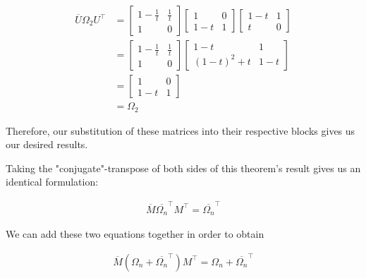 \documentclass[10pt]{ucthesis}
\begin{document}
\begin{equation}
	\begin{aligned}
		\overline{U}\Omega_2U^\intercal &= \begin{bmatrix}
													1-\frac{1}{t} & \frac{1}{t}\\
													1 & 0 
													\end{bmatrix}
													\begin{bmatrix}
													1 & 0\\
													1-t & 1 
													\end{bmatrix}
													\begin{bmatrix}
													1-t & 1\\
													t & 0 
													\end{bmatrix}\\
												&= \begin{bmatrix}
													1-\frac{1}{t} & \frac{1}{t}\\
													1 & 0 
													\end{bmatrix}
													\begin{bmatrix}
													1-t & 1\\
													(1-t)^2 + t & 1-t 
													\end{bmatrix}\\
												&= \begin{bmatrix}
													1 & 0\\
													1-t & 1 
													\end{bmatrix} \\
												&= \Omega_2
	\end{aligned}
\end{equation}

Therefore, our substitution of these matrices into their respective blocks gives us our desired results. \qedsymbol \cite{Kassel}

Taking the "conjugate"-transpose of both sides of this theorem's result gives us an identical formulation:

\begin{equation}
	\begin{aligned}
		\overline{M} \overline{\Omega_n}^\intercal M^\intercal = \overline{\Omega_n}^\intercal
	\end{aligned}
\end{equation}

We can add these two equations together in order to obtain

\begin{equation}
	\begin{aligned}
		\overline{M}(\Omega_n + \overline{\Omega_n}^\intercal )M^\intercal = \Omega_n + \overline{\Omega_n}^\intercal 
	\end{aligned}
\end{equation}
\end{document}

